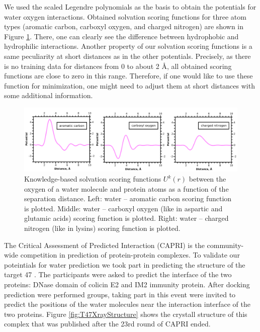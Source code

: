 We used the scaled Legendre polynomials as the basis to obtain the potentials for water oxygen interactions. 
Obtained solvation scoring functions for three atom types (aromatic carbon, carboxyl oxygen, and charged nitrogen) are shown in Figure \ref{fig:WaterPotentials}. 
There, one can clearly see the difference between hydrophobic and hydrophilic interactions. Another property of our solvation scoring functions is a same 
peculiarity at short distances as in the other potentials.
Precisely, as there is no training data for distances from 0 to about 2 \AA, all obtained scoring functions are close to zero in this range. 
Therefore, if one would like to use these function for minimization, one might need to adjust them at short distances with some additional information.

\begin{figure}
\begin{center}
\includegraphics[width=1\textwidth]{Scoring/Fig/3plots_01.pdf}
\caption[Knowledge-based solvation scoring functions]{Knowledge-based solvation scoring functions  $U^{k}(r)$ between the oxygen of a water molecule and 
protein atoms as a function of the separation distance. Left: water -- aromatic carbon scoring function is plotted. 
Middle: water -- carboxyl oxygen (like in aspartic and glutamic acids) scoring function is plotted. Right: water -- charged nitrogen (like in lysins) scoring function is plotted.}
\label{fig:WaterPotentials} 
\end{center}
\end{figure}

The Critical Assessment of Predicted Interaction (CAPRI) \cite{Mendez2003,Mendez2005,Janin2009} is the community-wide competition in prediction of protein-protein complexes. To 
validate our poteintials for water prediction we took part in predicting the structure of the target 47 \cite{lensink2014blind}. The participants were asked to predict the interface of the 
two proteins: DNase domain of colicin E2 and IM2 immunity protein. After docking prediction were performed groups, taking part in this event were invited to predict 
the positions of the water molecules near the interaction interface of the two proteins. Figure \ref{fig:T47XrayStructure} shows the crystall structure of this complex that was
published after the 23rd round of CAPRI ended.

